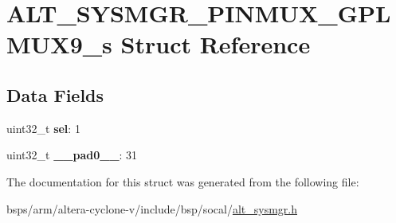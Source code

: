 \hypertarget{structALT__SYSMGR__PINMUX__GPLMUX9__s}{}\section{A\+L\+T\+\_\+\+S\+Y\+S\+M\+G\+R\+\_\+\+P\+I\+N\+M\+U\+X\+\_\+\+G\+P\+L\+M\+U\+X9\+\_\+s Struct Reference}
\label{structALT__SYSMGR__PINMUX__GPLMUX9__s}
\subsection*{Data Fields}
\begin{DoxyCompactItemize}
\item 
\mbox{\label{structALT__SYSMGR__PINMUX__GPLMUX9__s_aae629bf8269ac781a9ccf51612c77b2d}} 
uint32\+\_\+t {\bfseries sel}\+: 1
\item 
\mbox{\label{structALT__SYSMGR__PINMUX__GPLMUX9__s_ae8b6fa3ce4316fbc296c47672baf29d6}} 
uint32\+\_\+t {\bfseries \+\_\+\+\_\+pad0\+\_\+\+\_\+}\+: 31
\end{DoxyCompactItemize}


The documentation for this struct was generated from the following file\+:\begin{DoxyCompactItemize}
\item 
bsps/arm/altera-\/cyclone-\/v/include/bsp/socal/\mbox{\hyperlink{alt__sysmgr_8h}{alt\+\_\+sysmgr.\+h}}\end{DoxyCompactItemize}
